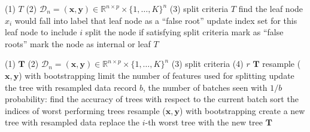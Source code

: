 \begin{minipage}[t]{0.49\columnwidth}
\begin{algorithm}[H]
\caption{Incrementally update an XTree with a batch of training samples.}
\label{alg:XTree}
\begin{algorithmic}[1]
\Require 
\Statex (1) $T$ 
\Statex (2) $\mathcal{D}_n = (\mathbf{x},\mathbf{y}) \in \mathbb{R}^{n \times p} \times \{1,\ldots, K\}^n$ 
\Statex (3) split criteria 
\Ensure
$T$ 
\State find the leaf node $x_i$ would fall into
\State label that leaf node as a ``false root''
\State update index set for this leaf node to include $i$
\EndFor
{}
\State split the node if satisfying split criteria
\State mark as ``false roots''
\EndFor 
\State mark the node as internal or leaf
\EndFor
\State \Return $T$
\EndFunction 
\end{algorithmic}
\end{algorithm}
\end{minipage}
\hfill
\begin{minipage}[t]{0.5\columnwidth}
\begin{algorithm}[H]
\caption{Incrementally update an XForest with a batch of training samples.}
\label{alg:XForest}
\begin{algorithmic}[1]
\Require
\Statex (1) $\mathbf{T}$ 
\Statex (2) $\mathcal{D}_n = (\mathbf{x},\mathbf{y}) \in \mathbb{R}^{n \times p} \times \{1,\ldots, K\}^n$ 
\Statex (3) split criteria 
\Statex (4) $r$ 
\Ensure
$\mathbf{T}$ 
\State resample ($\mathbf{x},\mathbf{y}$) with bootstrapping
\State limit the number of features used for splitting
\State update the tree with resampled data 
\EndFor
\State record $b$, the number of batches seen
with $1/b$ probability:
\State find the accuracy of trees with respect to the current batch
\State sort the indices of worst performing trees
\State resample ($\mathbf{x},\mathbf{y}$) with bootstrapping
\State create a new tree with resampled data
\State replace the $i$-th worst tree with the new tree 
\EndFor
\EndIf
\State \Return $\mathbf{T}$
\EndFunction
\end{algorithmic}
\end{algorithm}
\end{minipage}

